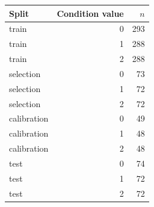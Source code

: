 \begin{tabular}{lrr}
\toprule
Split & Condition value & $n$\\
\midrule
train & 0 & 293\\
train & 1 & 288\\
train & 2 & 288\\
selection & 0 & 73\\
selection & 1 & 72\\
selection & 2 & 72\\
calibration & 0 & 49\\
calibration & 1 & 48\\
calibration & 2 & 48\\
test & 0 & 74\\
test & 1 & 72\\
test & 2 & 72\\
\bottomrule
\end{tabular}
